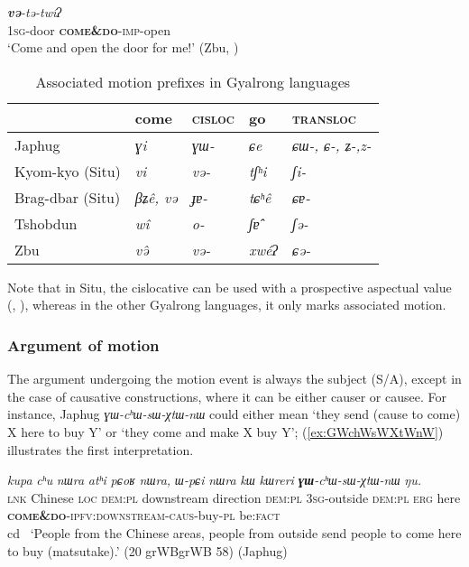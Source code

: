 \documentclass[oneside,a4paper,11pt]{article}
\newcommand{\ipa}[1]{{\phon\textit{#1}}}
\newcommand{\forme}[1]{\textit{\phon#1}}
\newcommand{\sens}[1]{‘#1’}
\newcommand{\rouge}[1]{\textbf{#1}}
\begin{document}
\begin{exe}
\ex \label{ex:vEtEtwi}
\gll  \ipa{ɐ-kómʔ}	\ipa{\rouge{və}-tə-twíʔ} \\
\textsc{1sg}-door  \rouge{\textsc{come\&do}}-\textsc{imp}-open \\
\glt  \sens{Come and open the door for me!} (Zbu, \citealt{gong18these})
\end{exe}

\begin{table}[H]
\caption{Associated motion prefixes in Gyalrong languages} \centering \label{tab:am-gyalrong}
\begin{tabular}{lllll}
\toprule
&come & \textsc{cisloc} & go & \textsc{transloc} \\
\midrule
Japhug &  \ipa{ɣi} &\ipa{ɣɯ-} &\ipa{ɕe} &\ipa{ɕɯ-, ɕ-, ʑ-,z- } \\
Kyom-kyo (Situ) &\ipa{vi} &\ipa{və-} &\ipa{tʃʰi} &\ipa{ʃi-} \\
Brag-dbar (Situ) &\ipa{βʑê, və} &\ipa{ɟɐ-} &\ipa{tɕʰê} &\ipa{ɕɐ-} \\
Tshobdun & \ipa{wî}& \ipa{o-} &\ipa{ʃɐ̂} &\ipa{ʃə-} \\
Zbu & \ipa{və̂}& \ipa{və-} &\ipa{xwéʔ} &\ipa{ɕə-} \\
\bottomrule
\end{tabular}
\end{table}

Note that in Situ, the cislocative can be used with a prospective aspectual  value (\citealt{linyj03tense}, \citealt[204]{zhang16bragdbar}), whereas in the other Gyalrong languages, it only marks associated motion.

\subsubsection{Argument of motion}

The argument undergoing the motion event is always the subject (S/A), except in the case of causative constructions, where it can be either causer or causee. For instance, Japhug \forme{ɣɯ-cʰɯ-sɯ-χtɯ-nɯ} could either mean `they send (cause to come) X here to buy Y' or `they come and make X buy Y'; (\ref{ex:GWchWsWXtWnW}) illustrates the first interpretation.  

\begin{exe}
\ex \label{ex:GWchWsWXtWnW}
\gll \ipa{tɕe} 	\ipa{kupa} 	\ipa{cʰu} 	\ipa{nɯra} 	\ipa{atʰi} 	\ipa{pɕoʁ} 	\ipa{nɯra,} 	\ipa{ɯ-pɕi} 	\ipa{nɯra} 	\ipa{kɯ} 	\ipa{kɯreri} 	\ipa{\rouge{ɣɯ}-cʰɯ-sɯ-χtɯ-nɯ} 	\ipa{ŋu.}  \\
\textsc{lnk} Chinese \textsc{loc} \textsc{dem:pl} downstream direction \textsc{dem:pl} \textsc{3sg}-outside  \textsc{dem:pl}  \textsc{erg} here \textsc{\rouge{come\&do}-ipfv:downstream-caus}-buy-\textsc{pl} be:\textsc{fact} \\cd \
\glt \sens{People from the Chinese areas, people from outside send people to come here to buy (matsutake).} (20 grWBgrWB 58) (Japhug)
  \end{exe} 
\end{document}
